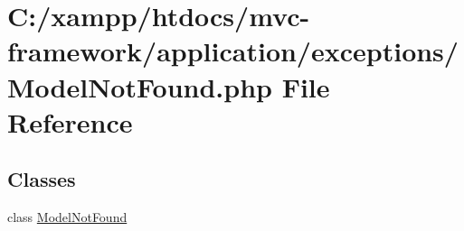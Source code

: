 \hypertarget{_model_not_found_8php}{}\section{C\+:/xampp/htdocs/mvc-\/framework/application/exceptions/\+Model\+Not\+Found.php File Reference}
\label{_model_not_found_8php}
\subsection*{Classes}
\begin{DoxyCompactItemize}
\item 
class \hyperlink{class_model_not_found}{Model\+Not\+Found}
\end{DoxyCompactItemize}
